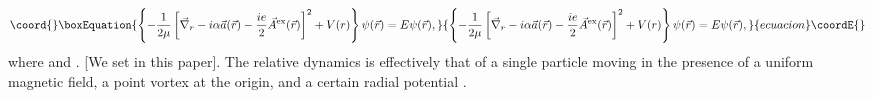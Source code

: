 \documentclass[a4paper,aps,eqsecnum,preprint,preprintnumbers,12pt]{revtex4}
\begin{document}
\begin{equation}\coord{}\boxEquation{ \label{eom}
\left\{ -\frac{1}{2\mu} \left[ \vec{\nabla}_{r} - i \alpha
\vec{a}(\vec{r}) - \frac{ie}{2} \vec{A}^{\rm ex}(\vec{r})
\right]^{2} + V(r) \right\} \psi(\vec{r}) = E \psi(\vec{r}),
}{ \left\{ -\frac{1}{2\mu} \left[ \vec{\nabla}_{r} - i \alpha
\vec{a}(\vec{r}) - \frac{ie}{2} \vec{A}^{\rm ex}(\vec{r})
\right]^{2} + V(r) \right\} \psi(\vec{r}) = E \psi(\vec{r}),
}{ecuacion}\coordE{}\end{equation}
where \coordHE{} and \coordHE{}. [We set \coordHE{} in this paper]. The relative dynamics is effectively that of a
single particle moving in the presence of a uniform magnetic
field, a point vortex at the origin, and a certain radial
potential \coordHE{}.
\end{document}
